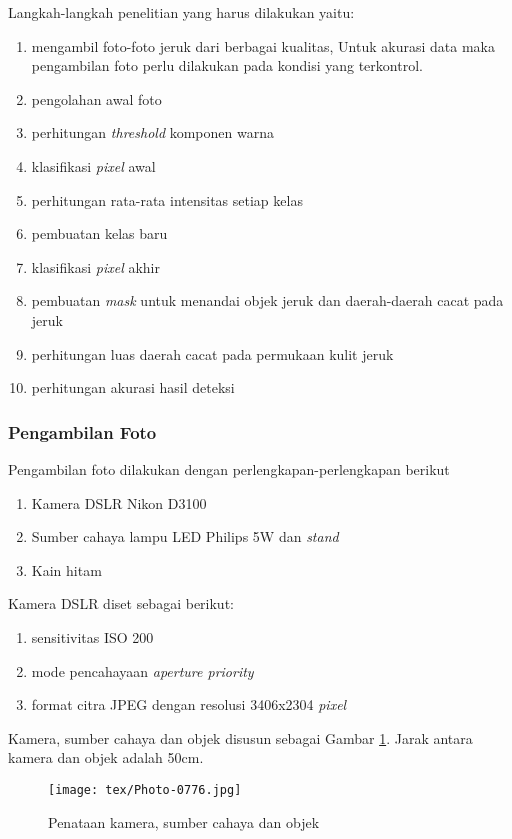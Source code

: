 \documentclass[laporan.tex]{subfiles}
\begin{document}
Langkah-langkah penelitian yang harus dilakukan yaitu:

\begin{enumerate}
\item mengambil foto-foto jeruk dari berbagai kualitas, Untuk akurasi data maka pengambilan foto perlu dilakukan pada kondisi yang terkontrol.
\item pengolahan awal foto
\item perhitungan \emph{threshold} komponen warna
\item klasifikasi \emph{pixel} awal
\item perhitungan rata-rata intensitas setiap kelas
\item pembuatan kelas baru
\item klasifikasi \emph{pixel} akhir
\item pembuatan \emph{mask} untuk menandai objek jeruk dan daerah-daerah cacat pada jeruk
\item perhitungan luas daerah cacat pada permukaan kulit jeruk
\item perhitungan akurasi hasil deteksi
\end{enumerate}

\subsubsection{Pengambilan Foto} \label{photoshoot}

Pengambilan foto dilakukan dengan perlengkapan-perlengkapan berikut

\begin{enumerate}
\item Kamera DSLR Nikon D3100
\item Sumber cahaya lampu LED Philips 5W dan \emph{stand}
\item Kain hitam
\end{enumerate}

Kamera DSLR diset sebagai berikut: 
\begin{enumerate}
\item sensitivitas ISO 200
\item mode pencahayaan \emph{aperture priority}
\item format citra JPEG dengan resolusi 3406x2304 \emph{pixel}
\end{enumerate}

Kamera, sumber cahaya dan objek disusun sebagai Gambar \ref{fig:setup}. Jarak antara kamera dan objek adalah 50cm.
\begin{figure}[h]
\centering
\texttt{[image: tex/Photo-0776.jpg]}
\caption{Penataan kamera, sumber cahaya dan objek}
\label{fig:setup}
\end{figure}
\end{document}

